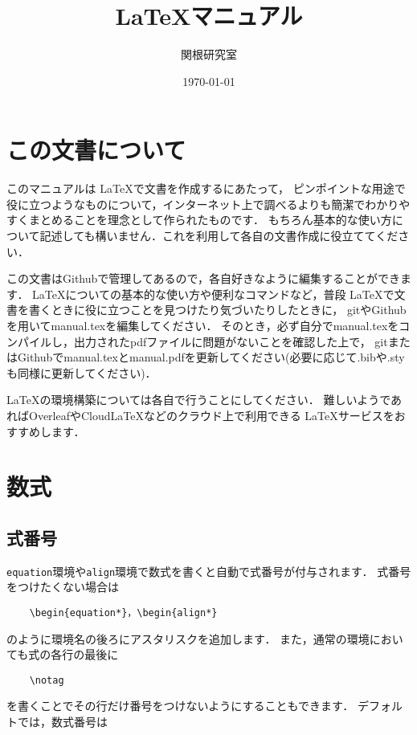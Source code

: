 \documentclass[a4paper,11pt,titlepage]{jsarticle}
\numberwithin{equation}{section}
\theoremstyle{definition}
\begin{document}
\title{\LaTeX マニュアル}
\author{関根研究室}
\date{\today}
\maketitle

\tableofcontents

\newpage

\section{この文書について}

このマニュアルは \LaTeX で文書を作成するにあたって，
ピンポイントな用途で役に立つようなものについて，インターネット上で調べるよりも簡潔でわかりやすくまとめることを理念として作られたものです．
もちろん基本的な使い方について記述しても構いません．これを利用して各自の文書作成に役立ててください．

この文書はGithubで管理してあるので，各自好きなように編集することができます．
\LaTeX についての基本的な使い方や便利なコマンドなど，普段 \LaTeX で文書を書くときに役に立つことを見つけたり気づいたりしたときに，
gitやGithubを用いてmanual.texを編集してください．
そのとき，必ず自分でmanual.texをコンパイルし，出力されたpdfファイルに問題がないことを確認した上で，
gitまたはGithubでmanual.texとmanual.pdfを更新してください(必要に応じて.bibや.styも同様に更新してください)．

\LaTeX の環境構築については各自で行うことにしてください．
難しいようであればOverleafやCloudLaTeXなどのクラウド上で利用できる \LaTeX サービスをおすすめします．

\newpage

\section{数式}

\subsection{式番号}

\verb|equation|環境や\verb|align|環境で数式を書くと自動で式番号が付与されます．
式番号をつけたくない場合は
\begin{verbatim}
    \begin{equation*}，\begin{align*}
\end{verbatim}
のように環境名の後ろにアスタリスクを追加します．
また，通常の環境においても式の各行の最後に
\begin{verbatim}
    \notag
\end{verbatim}
を書くことでその行だけ番号をつけないようにすることもできます．
デフォルトでは，数式番号は
\end{document}
